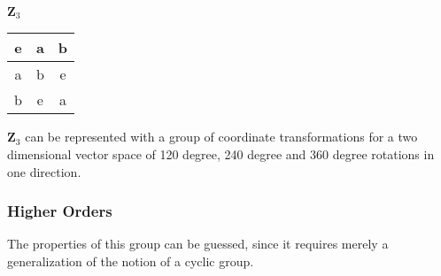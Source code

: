 \begin{table} [H]
\center
$\mathbf{Z}_3$\\
\begin{tabular}{c||cc} 
  e & a & b  \\ 
  \hline 
     a & b & e  \\ 
     b & e & a  
     
\end{tabular} 
\end{table} 

$ \mathbf{Z}_3 $ can be represented with a group of coordinate transformations for a two dimensional vector space of 120 degree, 240 degree and 360 degree rotations in one direction.

\subsubsection*{Higher Orders}

The properties of this group can be guessed, since it requires merely a generalization of the notion of a cyclic group.


